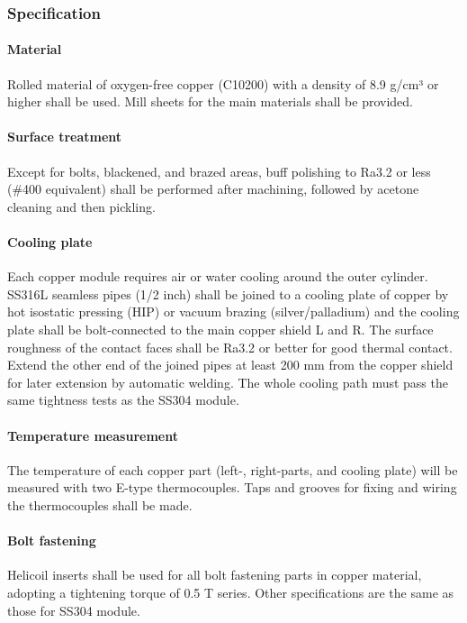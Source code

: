 \documentclass[12pt,a4paper]{article}
\begin{document}
\subsubsection{Specification}
\paragraph{Material}
Rolled material of oxygen-free copper (C10200) with a density of 8.9 g/cm³ or higher shall be used. Mill sheets for the main materials shall be provided.

\paragraph{Surface treatment} 
Except for bolts, blackened, and brazed areas,  buff polishing to Ra3.2 or less (\#400 equivalent)  shall be performed after machining, followed by acetone cleaning and then pickling. 

\paragraph{Cooling plate}
Each copper module requires air or water cooling around the outer cylinder. SS316L seamless pipes (1/2 inch) shall be joined to a cooling plate of copper by hot isostatic pressing (HIP) or vacuum brazing (silver/palladium) and the cooling plate shall be bolt-connected to the main copper shield L and R. The surface roughness of the contact faces shall be Ra3.2 or better for good thermal contact. Extend the other end of the joined pipes at least 200 mm from the copper shield for later extension by automatic welding. 
The whole cooling path must pass the same tightness tests as the SS304 module.


\paragraph{Temperature measurement}
The temperature of each copper part (left-, right-parts, and cooling plate) will be measured with two E-type thermocouples. Taps and grooves for fixing and wiring the thermocouples shall be made. 

\paragraph{Bolt fastening}
Helicoil inserts shall be used for all bolt fastening parts in copper material, adopting a tightening torque of 0.5 T series. Other specifications are the same as those for SS304 module.
\end{document}
